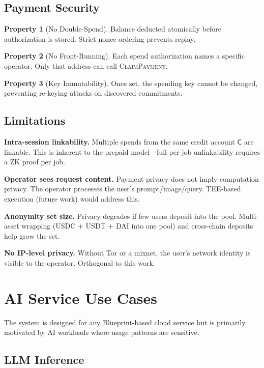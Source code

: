 \documentclass[11pt,a4paper]{article}
\theoremstyle{definition}
\newtheorem{property}{Property}
\begin{document}
\subsection{Payment Security}

\begin{property}[No Double-Spend]
Balance deducted atomically before authorization is stored. Strict nonce ordering prevents replay.
\end{property}

\begin{property}[No Front-Running]
Each spend authorization names a specific operator. Only that address can call \textsc{ClaimPayment}.
\end{property}

\begin{property}[Key Immutability]
Once set, the spending key cannot be changed, preventing re-keying attacks on discovered commitments.
\end{property}

\subsection{Limitations}

\textbf{Intra-session linkability.} Multiple spends from the same credit account $\mathsf{C}$ are linkable. This is inherent to the prepaid model---full per-job unlinkability requires a ZK proof per job.

\textbf{Operator sees request content.} Payment privacy does not imply computation privacy. The operator processes the user's prompt/image/query. TEE-based execution (future work) would address this.

\textbf{Anonymity set size.} Privacy degrades if few users deposit into the pool. Multi-asset wrapping (USDC + USDT + DAI into one pool) and cross-chain deposits help grow the set.

\textbf{No IP-level privacy.} Without Tor or a mixnet, the user's network identity is visible to the operator. Orthogonal to this work.

\section{AI Service Use Cases}

The system is designed for any Blueprint-based cloud service but is primarily motivated by AI workloads where usage patterns are sensitive.

\subsection{LLM Inference}
\end{document}
